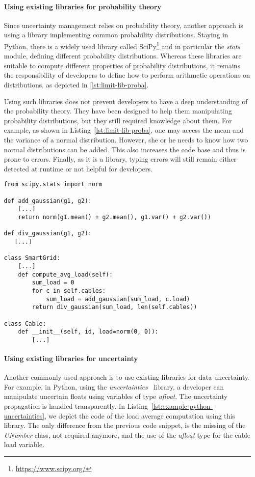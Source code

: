 \paragraph{Using existing libraries for probability theory}
Since uncertainty management relies on probability theory, another approach is using a library implementing common probability distributions.
Staying in Python, there is a widely used library called SciPy\footnote{\url{https://www.scipy.org/}} and in particular the \textit{stats} module, defining different probability distributions.
Whereas these libraries are suitable to compute different properties of probability distributions, it remains the responsibility of developers to define how to perform arithmetic operations on distributions, as depicted in \autoref{lst:limit-lib-proba}.

Using such libraries does not prevent developers to have a deep understanding of the probability theory.
They have been designed to help them manipulating probability distributions, but they still required knowledge about them.
For example, as shown in Listing~\ref{lst:limit-lib-proba}, one may access the mean and the variance of a normal distribution.
However, she or he needs to know how two normal distributions can be added.
This also increases the code base and thus is prone to errors.
Finally, as it is a library, typing errors will still remain either detected at runtime or not helpful for developers.


\begin{lstlisting}[style=pythonStyle, caption=Limitation using a probability library (Python), label=lst:limit-lib-proba, linewidth=0.97\textwidth]
from scipy.stats import norm

def add_gaussian(g1, g2):
    [...]
    return norm(g1.mean() + g2.mean(), g1.var() + g2.var())

def div_gaussian(g1, g2):
   [...]

class SmartGrid:
    [...]
    def compute_avg_load(self):
        sum_load = 0
        for c in self.cables:
            sum_load = add_gaussian(sum_load, c.load)
        return div_gaussian(sum_load, len(self.cables))

class Cable:
    def __init__(self, id, load=norm(0, 0)):
        [...]
\end{lstlisting}

\paragraph{Using existing libraries for uncertainty}
Another commonly used approach is to use existing libraries for data uncertainty.
For example, in Python, using the \textit{uncertainties}~\cite{url:uncertainties} library, a developer can manipulate uncertain floats using variables of type \textit{ufloat}.
The uncertainty propagation is handled transparently.
In Listing~\ref{lst:example-python-uncertainties}, we depict the code of the load average computation using this library.
The only difference from the previous code snippet, is the missing of the \textit{UNumber} class, not required anymore, and the use of the \textit{ufloat} type for the cable load variable.

